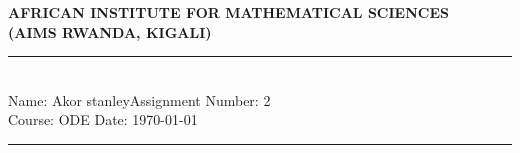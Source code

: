 \documentclass[12pt,a4paper]{article}
\newcommand{\student}{Akor stanley}
\newcommand{\course}{ODE }
\newcommand{\assignment}{2}
\begin{document}
\thispagestyle{empty}
\begin{center}
\textbf{AFRICAN INSTITUTE FOR MATHEMATICAL SCIENCES \\[0.5cm]
(AIMS RWANDA, KIGALI)}
\vspace{1.0cm}
\end{center}

\noindent
\rule{17cm}{0.2cm}\\[0.3cm]
Name: \student \hfill Assignment Number: \assignment\\[0.1cm]
Course: \course \hfill Date: \today\\
\rule{17cm}{0.05cm}
\vspace{1.0cm}
\end{document}

